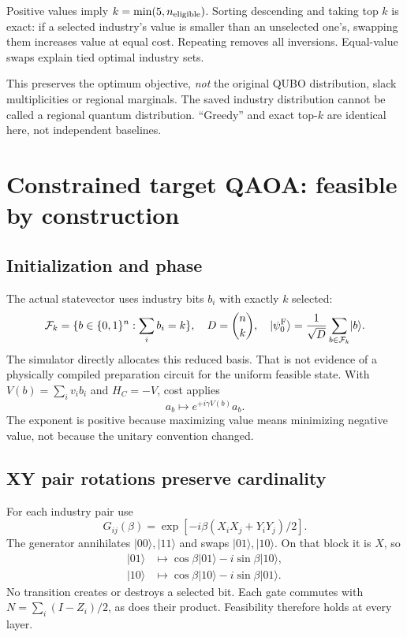 \documentclass[11pt,letterpaper]{article}
\newcommand{\ket}[1]{\lvert #1\rangle}
\begin{document}
Positive values imply $k=\min(5,n_{\rm eligible})$. Sorting descending and taking top $k$ is exact: if a selected industry's value is smaller than an unselected one's, swapping them increases value at equal cost. Repeating removes all inversions. Equal-value swaps explain tied optimal industry sets.

This preserves the optimum objective, \emph{not} the original QUBO distribution, slack multiplicities or regional marginals. The saved industry distribution cannot be called a regional quantum distribution. ``Greedy'' and exact top-$k$ are identical here, not independent baselines.
\section{Constrained target QAOA: feasible by construction}\label{sec:targetqaoa}
\subsection{Initialization and phase}
The actual statevector uses industry bits $b_i$ with exactly $k$ selected:
\begin{equation}
 \mathcal F_k=\{b\in\{0,1\}^n:\sum_i b_i=k\},\quad D=\binom nk,\quad
 \ket{\psi_0^{\rm F}}=\frac1{\sqrt D}\sum_{b\in\mathcal F_k}\ket b.
\end{equation}
The simulator directly allocates this reduced basis. That is not evidence of a physically compiled preparation circuit for the uniform feasible state. With $V(b)=\sum_i v_i b_i$ and $H_C=-V$, cost applies
\begin{equation}
 a_b\longmapsto e^{+i\gamma V(b)}a_b.
\end{equation}
The exponent is positive because maximizing value means minimizing negative value, not because the unitary convention changed.

\subsection{XY pair rotations preserve cardinality}
For each industry pair use
\begin{equation}
 G_{ij}(\beta)=\exp[-i\beta(X_iX_j+Y_iY_j)/2].
\end{equation}
The generator annihilates $\ket{00},\ket{11}$ and swaps $\ket{01},\ket{10}$. On that block it is $X$, so
\begin{align}
 \ket{01}&\mapsto\cos\beta\ket{01}-i\sin\beta\ket{10},\\
 \ket{10}&\mapsto\cos\beta\ket{10}-i\sin\beta\ket{01}.
\end{align}
No transition creates or destroys a selected bit. Each gate commutes with $N=\sum_i(I-Z_i)/2$, as does their product. Feasibility therefore holds at every layer.
\end{document}
